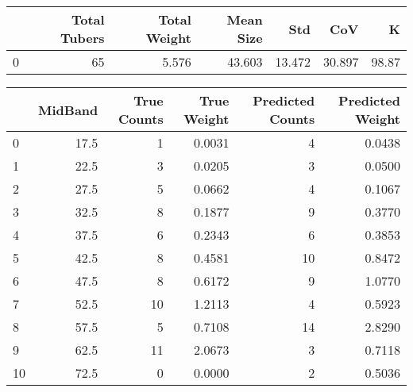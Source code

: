 \begin{tabular}{lrrrrrr}
\toprule
{} &  Total Tubers &  Total Weight &  Mean Size &     Std &     CoV &      K \\
\midrule
0 &            65 &         5.576 &     43.603 &  13.472 &  30.897 &  98.87 \\
\bottomrule
\end{tabular}

\begin{tabular}{lrrrrr}
\toprule
{} &  MidBand &  True Counts &  True Weight &  Predicted Counts &  Predicted Weight \\
\midrule
0  &     17.5 &            1 &       0.0031 &                 4 &            0.0438 \\
1  &     22.5 &            3 &       0.0205 &                 3 &            0.0500 \\
2  &     27.5 &            5 &       0.0662 &                 4 &            0.1067 \\
3  &     32.5 &            8 &       0.1877 &                 9 &            0.3770 \\
4  &     37.5 &            6 &       0.2343 &                 6 &            0.3853 \\
5  &     42.5 &            8 &       0.4581 &                10 &            0.8472 \\
6  &     47.5 &            8 &       0.6172 &                 9 &            1.0770 \\
7  &     52.5 &           10 &       1.2113 &                 4 &            0.5923 \\
8  &     57.5 &            5 &       0.7108 &                14 &            2.8290 \\
9  &     62.5 &           11 &       2.0673 &                 3 &            0.7118 \\
10 &     72.5 &            0 &       0.0000 &                 2 &            0.5036 \\
\bottomrule
\end{tabular}


